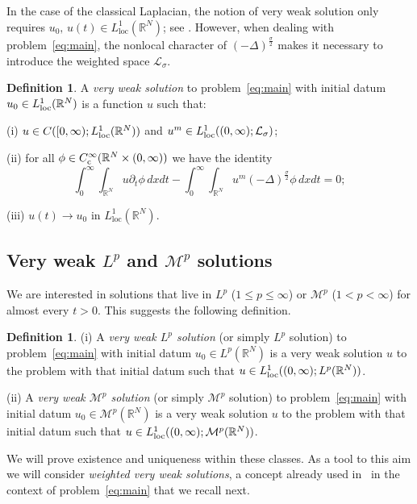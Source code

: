 \documentclass[leqno,12pt]{amsart}
\theoremstyle{definition}
\newtheorem{definition}[theorem]{Definition}
\theoremstyle{remark}
\numberwithin{equation}{section}
\begin{document}
In the case of the classical Laplacian, the notion of very weak solution only requires
$u_0,\, u(t)\in L^1_{\mathrm{loc}}(\mathbb{R}^N)$; see \cite{herreropierre}. However, when dealing with problem~\eqref{eq:main}, the nonlocal character of $(-\Delta)^{\frac\sigma2}$ makes it necessary to introduce the weighted space $\mathcal{L}_{\sigma}$. 
\begin{definition}\label{def1}
A \emph{very weak solution} to problem~\eqref{eq:main} with initial datum $u_0\in L^1_{\textup{loc}}(\mathbb{R}^N)$ is a function $u$ such that:

\noindent\textup{(i)} $u\in C([0,\infty);L^1_{\textup{loc}}({\mathbb{R}^N}))$ and $u^m\in L^1_{\textup{loc}}((0,\infty);\mathcal{L}_{\sigma})$;

\noindent\textup{(ii)} for all $\phi\in C^{\infty}_{\textup{c}}(\mathbb{R}^N\times (0,\infty))$ we have the identity
\begin{equation}\label{vwe}
    \int_{0}^{\infty}\int_{\mathbb{R}^N}u\partial_t\phi \,dxdt-\int_{0}^{\infty}\int_{\mathbb{R}^N}u^m(-\Delta)^{\frac\sigma2}\phi \,dxdt=0;
\end{equation}

\noindent\textup{(iii)} $u(t)\to u_0$ in $L^1_{\text{loc}}(\mathbb{R}^N)$.
\end{definition}


\subsection*{Very weak \texorpdfstring{$L^p$ and $\mathcal{M}^p$}{Lp and Mp} solutions} 
We are interested in solutions that live in $L^p$ ($1\le p\le\infty$) or $\mathcal{M}^p$ ($1< p<\infty$) for almost every $t>0$. This suggests the following definition.
\begin{definition}\label{def:Lp.Mp}
    \textup{(i)} A \emph{very weak $L^p$ solution} (or simply $L^p$ solution) to problem~\eqref{eq:main} with initial datum $u_0\in L^p(\mathbb{R}^N)$  is a very weak solution $u$ to the problem with that initial datum such that $u\in L^1_{\rm loc}((0,\infty);L^p (\mathbb{R}^N))$.

\noindent\textup{(ii)} A \emph{very weak $\mathcal{M}^p$ solution} (or simply $\mathcal{M}^p$ solution) to problem~\eqref{eq:main} with initial datum $u_0\in \mathcal{M}^p(\mathbb{R}^N)$   is a very weak solution $u$ to the problem with that initial datum such that $u\in L^1_{\rm loc}((0,\infty);\mathcal{M}^p (\mathbb{R}^N))$.
\end{definition}
We will prove existence and uniqueness within these classes. As a tool to this aim we will consider \emph{weighted very weak solutions}, a concept already used in~\cite{b3} in the context of problem~\eqref{eq:main} that we recall next.
\end{document}
